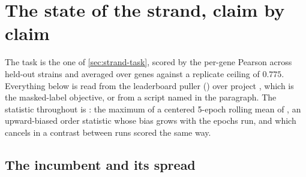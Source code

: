 
\section{The state of the strand, claim by claim}
\label{sec:findings}

The task is the one of \cref{sec:strand-task}, scored by the per-gene Pearson across
held-out strains and averaged over genes against a replicate ceiling of $0.775$.
Everything below is read from the leaderboard puller () over project
, which is the masked-label objective, or from a script named
in the paragraph. The statistic throughout is : the maximum of a centered
5-epoch rolling mean of , an upward-biased order
statistic whose bias grows with the epochs run, and which cancels in a contrast between
runs scored the same way.

\subsection{The incumbent and its spread}
\label{sec:findings-state}

